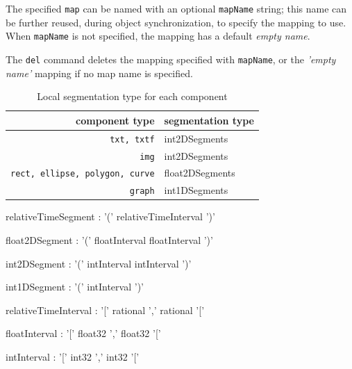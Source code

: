 \documentclass[a4paper,twoside]{report}
\newcommand{\OSC}[1]		{\texttt{#1}}
\begin{document}
The specified \OSC{map} can be named with an optional \OSC{mapName} string; this name can be further reused, during object synchronization, to specify the mapping to use. When \OSC{mapName} is not specified, the mapping has a default \emph{empty name}.

The \OSC{del} command deletes the mapping specified with \OSC{mapName}, or the \emph{'empty name'} mapping if no map name is specified.


\begin{table}[htdp]
\caption{Local segmentation type for each component}
\begin{center}
\begin{tabular}{|r|l|}
\hline
component type & segmentation type \\
\hline
\OSC{txt, txtf}		& int2DSegments \\
\OSC{img}			& int2DSegments \\
\OSC{rect, ellipse, polygon, curve}	&  float2DSegments \\
\OSC{graph}			&  int1DSegments \\
\hline
\end{tabular}
\end{center}
\label{maptable}
\end{table}

\begin{rail}
relativeTimeSegment : '(' relativeTimeInterval ')' 
\end{rail}
\begin{rail}
float2DSegment : '(' floatInterval floatInterval ')' 
\end{rail}
\begin{rail}
int2DSegment : '(' intInterval intInterval ')' 
\end{rail}
\begin{rail}
int1DSegment : '(' intInterval ')' 
\end{rail}


\begin{rail}
relativeTimeInterval : '[' rational ',' rational '[' 
\end{rail}
\begin{rail}
floatInterval : '[' float32 ',' float32 '['
\end{rail}
\begin{rail}
intInterval : '[' int32 ',' int32 '['
\end{rail}
\end{document}
